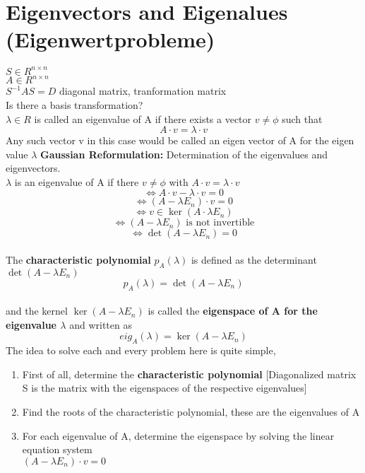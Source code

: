 \documentclass{article}
\begin{document}
\section{Eigenvectors and Eigenalues (Eigenwertprobleme)} 
$S \in R^{n\times n}$ \\
$A \in R^{n \times n}$ \\
$S^{-1}AS = D$ diagonal matrix, tranformation matrix \\
Is there a basis transformation? \\ 
$\lambda \in R$ is called an eigenvalue of A if there exists a vector $v \neq \phi$ such that \begin{equation*} A \cdot v = \lambda \cdot v \end{equation*}
Any such vector v in this case would be called an eigen vector of A for the eigen value $\lambda$
\textbf{Gaussian Reformulation:} Determination of the eigenvalues and eigenvectors. \\
$\lambda$ is an eigenvalue of A if there $v\neq\phi$ with $A\cdot v = \lambda \cdot v$
\begin{equation*}
    \Leftrightarrow A\cdot v - \lambda \cdot v = 0 \end{equation*}
\begin{equation*}\Leftrightarrow (A-\lambda E_n) \cdot v = 0 \end{equation*}
\begin{equation*} \Leftrightarrow v \in \ker(A\cdot\lambda E_n) \end{equation*}
\begin{equation*}\Leftrightarrow (A-\lambda E_n) \text{  is not invertible} \end{equation*}
\begin{equation*} \Leftrightarrow \det(A-\lambda E_n) = 0 
\end{equation*} \\[2pt]
The \textbf{characteristic polynomial} $p_A(\lambda)$ is defined as the determinant $\det(A-\lambda E_n)$ \begin{equation*} p_A(\lambda) = \det(A-\lambda E_n) \end{equation*} \\ and the kernel $\ker(A-\lambda E_n)$ is called the \textbf{eigenspace of A for the eigenvalue $\lambda$} and written as \begin{equation*} eig_A(\lambda) = \ker(A-\lambda E_n) \end{equation*}
The idea to solve each and every problem here is quite simple,
\begin{enumerate}
    \item First of all, determine the \textbf{characteristic polynomial} [Diagonalized matrix S is the matrix with the eigenspaces of the respective eigenvalues]
    \item Find the roots of the characteristic polynomial, these are the eigenvalues of A
    \item For each eigenvalue of A, determine the eigenspace by solving the linear equation system \\ $(A-\lambda E_n) \cdot v = 0$ 
\end{enumerate}
\end{document}
